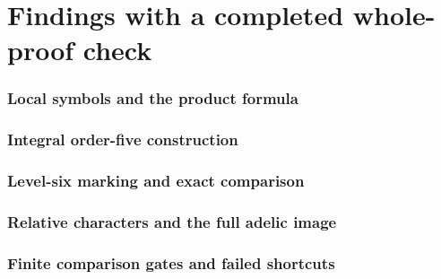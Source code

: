 \documentclass[11pt]{article}
\begin{document}
\part{Findings with a completed whole-proof check}
\section{Local symbols and the product formula}





\section{Integral order-five construction}





\section{Level-six marking and exact comparison}



\section{Relative characters and the full adelic image}



\section{Finite comparison gates and failed shortcuts}






















\end{document}
